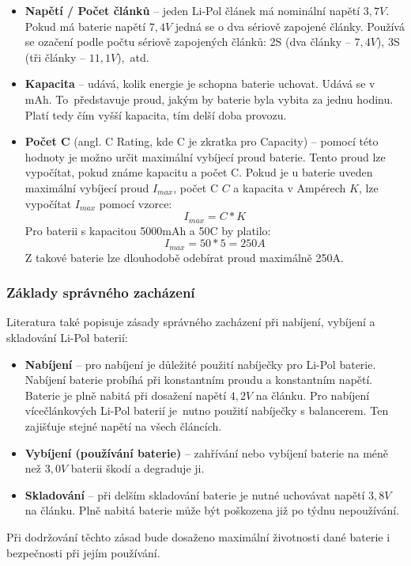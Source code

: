 \begin{itemize}
    \item \textbf{Napětí / Počet článků} -- jeden Li-Pol článek má nominální napětí $3,7V$. Pokud má baterie napětí $7,4V$ jedná se o dva sériově zapojené články. Používá se ozačení podle počtu sériově zapojených článků: 2S (dva články -- $7,4V$), 3S (tři články -- $11,1V$),~atd.
    
    \item \textbf{Kapacita} -- udává, kolik energie je schopna baterie uchovat. Udává se v mAh. To~představuje proud, jakým by baterie byla vybita za jednu hodinu. Platí tedy čím vyšší kapacita, tím delší doba provozu.
    
    \item \textbf{Počet C} (angl. C Rating, kde C je zkratka pro Capacity) -- pomocí této hodnoty je možno určit maximální vybíjecí proud baterie. Tento proud lze vypočítat, pokud známe kapacitu a počet C. Pokud je u baterie uveden maximální vybíjecí proud $I_{max}$, počet C $C$ a kapacita v Ampérech $K$, lze vypočítat $I_{max}$ pomocí vzorce:
    $$I_{max} = C * K$$
    Pro baterii s kapacitou 5000mAh a 50C by platilo:
    $$I_{max} = 50 * 5 = 250A$$
    Z takové baterie lze dlouhodobě odebírat proud maximálně 250A.
\end{itemize}


\subsubsection*{Základy správného zacházení}

Literatura \cite{batLipo} také popisuje zásady správného zacházení při nabíjení, vybíjení a skladování Li-Pol baterií:

\begin{itemize}
    \item \textbf{Nabíjení} -- pro nabíjení je důležité použití nabíječky pro Li-Pol baterie. Nabíjení baterie probíhá při konstantním proudu a konstantním napětí. Baterie je plně nabitá při dosažení napětí $4,2V$ na článku. Pro nabíjení vícečlánkových Li-Pol baterií je~nutno použití nabíječky s balancerem. Ten zajišťuje stejné napětí na všech článcích.
    
    \item \textbf{Vybíjení (používání baterie)} -- zahřívání nebo vybíjení baterie na méně než $3,0V$ baterii škodí a degraduje ji.

    \item \textbf{Skladování} -- při delším skladování baterie je nutné uchovávat napětí $3,8V$ na článku. Plně nabitá baterie může být poškozena již po týdnu nepoužívání.
\end{itemize}
Při dodržování těchto zásad bude dosaženo maximální životnosti dané baterie i bezpečnosti při jejím používání.

